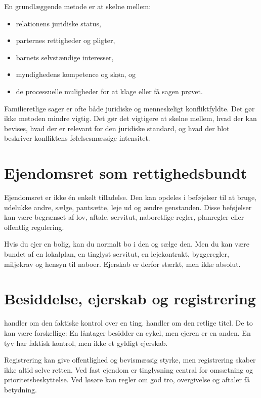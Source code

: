 En grundlæggende metode er at skelne mellem:
\begin{itemize}
  \item relationens juridiske status,
  \item parternes rettigheder og pligter,
  \item barnets selvstændige interesser,
  \item myndighedens kompetence og skøn, og
  \item de processuelle muligheder for at klage eller få sagen prøvet.
\end{itemize}

Familieretlige sager er ofte både juridiske og menneskeligt konfliktfyldte. Det gør ikke metoden mindre vigtig. Det gør det vigtigere at skelne mellem, hvad der kan bevises, hvad der er relevant for den juridiske standard, og hvad der blot beskriver konfliktens følelsesmæssige intensitet.

\section{Ejendomsret som rettighedsbundt}

Ejendomsret er ikke én enkelt tilladelse. Den kan opdeles i beføjelser til at bruge, udelukke andre, sælge, pantsætte, leje ud og ændre genstanden. Disse beføjelser kan være begrænset af lov, aftale, servitut, naboretlige regler, planregler eller offentlig regulering.

Hvis du ejer en bolig, kan du normalt bo i den og sælge den. Men du kan være bundet af en lokalplan, en tinglyst servitut, en lejekontrakt, byggeregler, miljøkrav og hensyn til naboer. Ejerskab er derfor stærkt, men ikke absolut.

\section{Besiddelse, ejerskab og registrering}

 handler om den faktiske kontrol over en ting.  handler om den retlige titel. De to kan være forskellige: En låntager besidder en cykel, men ejeren er en anden. En tyv har faktisk kontrol, men ikke et gyldigt ejerskab.

Registrering kan give offentlighed og bevismæssig styrke, men registrering skaber ikke altid selve retten. Ved fast ejendom er tinglysning central for omsætning og prioritetsbeskyttelse. Ved løsøre kan regler om god tro, overgivelse og aftaler få betydning.

